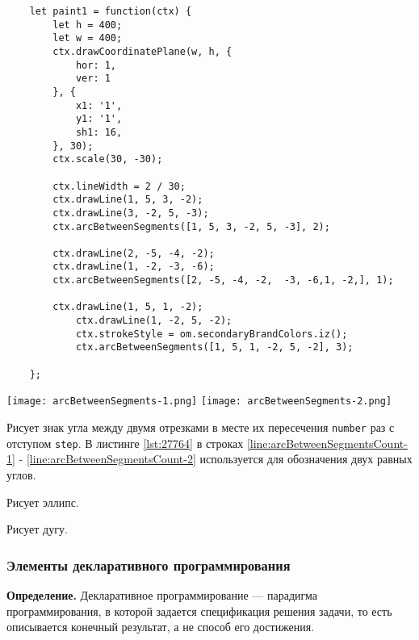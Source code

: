 \begin{lstlisting}
    let paint1 = function(ctx) {
        let h = 400;
        let w = 400;
        ctx.drawCoordinatePlane(w, h, {
            hor: 1,
            ver: 1
        }, {
            x1: '1',
            y1: '1',
            sh1: 16,
        }, 30);
        ctx.scale(30, -30);

        ctx.lineWidth = 2 / 30;
        ctx.drawLine(1, 5, 3, -2);
        ctx.drawLine(3, -2, 5, -3);
        ctx.arcBetweenSegments([1, 5, 3, -2, 5, -3], 2);

        ctx.drawLine(2, -5, -4, -2);
        ctx.drawLine(1, -2, -3, -6);
        ctx.arcBetweenSegments([2, -5, -4, -2,  -3, -6,1, -2,], 1);

        ctx.drawLine(1, 5, 1, -2);
		    ctx.drawLine(1, -2, 5, -2);
		    ctx.strokeStyle = om.secondaryBrandColors.iz();
		    ctx.arcBetweenSegments([1, 5, 1, -2, 5, -2], 3);

    };
\end{lstlisting}

\texttt{[image: arcBetweenSegments-1.png]}    
\texttt{[image: arcBetweenSegments-2.png]}    

Рисует знак угла между двумя отрезками в месте их пересечения \texttt{number} раз с отступом \texttt{step}. В листинге \ref{lst:27764} в строках \ref{line:arcBetweenSegmentsCount-1} - \ref{line:arcBetweenSegmentsCount-2} используется для обозначения двух равных углов.

Рисует эллипс.

Рисует дугу.

\subsubsection{Элементы декларативного программирования}

\textbf{Определение.} Декларативное программирование — парадигма программирования, в которой задается спецификация решения задачи, то есть описывается конечный результат, а не способ его достижения.~\cite{posobie}

